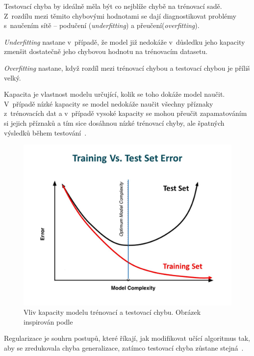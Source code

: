 Testovací chyba by ideálně měla být co nejblíže chybě na trénovací sadě. Z~rozdílu mezi těmito chybovými hodnotami se dají diagnostikovat problémy s~naučením sítě -- podučení (\textit{underfitting}) a přeučení(\textit{overfitting}).

\textit{Underfitting} nastane v~případě, že model již nedokáže v~důsledku jeho kapacity zmenšit dostatečně jeho chybovou hodnotu na trénovacím datasetu.

\textit{Overfitting} nastane, když rozdíl mezi trénovací chybou a testovací chybou je příliš velký.

Kapacita je vlastnost modelu určující, kolik se toho dokáže model naučit. V~případě nízké kapacity se model nedokáže naučit všechny příznaky z~trénovacích dat a v~případě vysoké kapacity se mohou přeučit zapamatováním si jejich příznaků a tím sice dosáhnou nízké trénovací chyby, ale špatných výsledků během testování~\cite{mitdeeplearning}.
\begin{figure}[H]
    \centering
    \includegraphics[scale=0.3]{obrazky-figures/capacity_vs_error.jpg}
    \caption{\label{fig:gradientdescent}Vliv kapacity modelu trénovací a testovací chybu. Obrázek inspirován podle~\cite{trainingvstesterror}}
\end{figure}


Regularizace je souhrn postupů, které říkají, jak modifikovat učící algoritmus tak, aby se zredukovala chyba generalizace, zatímco testovací chyba zůstane stejná~\cite{mitdeeplearning}.


